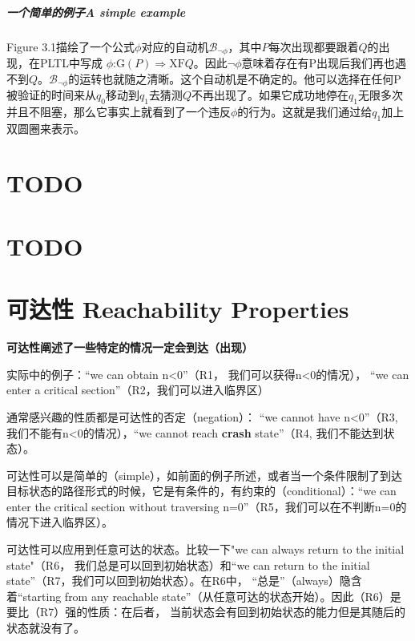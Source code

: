 \documentclass{book}
\begin{document}
    \paragraph{一个简单的例子{\itshape A simple example}} Figure 3.1描绘了一个公式$\phi$对应的自动机$\mathcal{B}_{\neg\phi}$，其中$P$每次出现都要跟着$Q$的出现，在PLTL中写成 $\phi$:$\text{G}(P)\Rightarrow\text{X}\text{F}Q$。因此$\neg\phi$意味着存在有P出现后我们再也遇不到$Q$。$\mathcal{B}_{\neg\phi}$的运转也就随之清晰。这个自动机是不确定的。他可以选择在任何P被验证的时间来从$q_0$移动到$q_1$去猜测$Q$不再出现了。如果它成功地停在$q_1$无限多次并且不阻塞，那么它事实上就看到了一个违反$\phi$的行为。这就是我们通过给$q_1$加上双圆圈来表示。

    \chapter{TODO}

    \chapter{TODO}

    \chapter{可达性 Reachability Properties}
    \textbf{可达性阐述了一些特定的情况一定会到达（出现）}

    实际中的例子：“we can obtain n<0”（R1， 我们可以获得n<0的情况）， “we can enter a critical section”（R2，我们可以进入临界区）

    通常感兴趣的性质都是可达性的否定（negation）： “we cannot have n<0”（R3, 我们不能有n<0的情况），“we cannot reach \textbf{crash} state”（R4, 我们不能达到状态）。

    可达性可以是简单的（simple），如前面的例子所述，或者当一个条件限制了到达目标状态的路径形式的时候，它是有条件的，有约束的（conditional）：“we can enter the critical section without traversing n=0”（R5，我们可以在不判断n=0的情况下进入临界区）。

    可达性可以应用到任意可达的状态。比较一下"we can always return to the initial state"（R6， 我们总是可以回到初始状态）和“we can return to the initial state”（R7，我们可以回到初始状态）。在R6中， “总是”（always）隐含着“starting from any reachable state”（从任意可达的状态开始）。因此（R6）是要比（R7）强的性质：在后者， 当前状态会有回到初始状态的能力但是其随后的状态就没有了。
\end{document}
